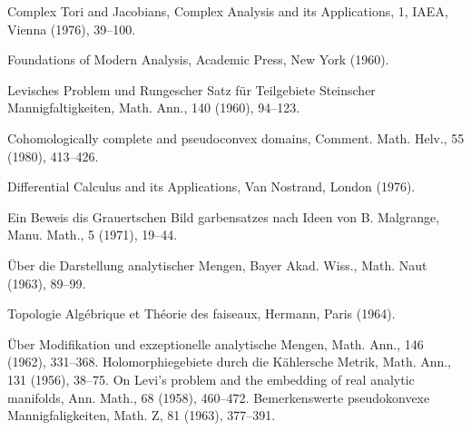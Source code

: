 \begin{sourcebibliography}
 Complex Tori and Jacobians, Complex Analysis and its Applications, 1, IAEA, Vienna (1976), 39--100.
\end{sourcebibliography}
\begin{sourcebibliography}
 Foundations of Modern Analysis, Academic Press, New York (1960).
\end{sourcebibliography}
\begin{sourcebibliography}
 Levisches Problem und Rungescher Satz f\"ur Teilgebiete Steinscher Mannigfaltigkeiten, Math. Ann., 140 (1960), 94--123.
\end{sourcebibliography}
\begin{sourcebibliography}
 Cohomologically complete and pseudoconvex domains, Comment. Math. Helv., 55 (1980), 413--426.
\end{sourcebibliography}
\begin{sourcebibliography}
 Differential Calculus and its Applications, Van Nostrand, London (1976).
\end{sourcebibliography}
\begin{sourcebibliography}
 Ein Beweis dis Grauertschen Bild garbensatzes nach Ideen von B. Malgrange, Manu. Math., 5 (1971), 19--44.
\end{sourcebibliography}
\begin{sourcebibliography}
 \"Uber die Darstellung analytischer Mengen, Bayer Akad. Wiss., Math. Naut (1963), 89--99.
\end{sourcebibliography}
\begin{sourcebibliography}
 Topologie Alg\'ebrique et Th\'eorie des faiseaux, Hermann, Paris (1964).
\end{sourcebibliography}
\begin{sourcebibliography}
 \"Uber Modifikation und exzeptionelle analytische Mengen, Math. Ann., 146 (1962), 331--368.
 Holomorphiegebiete durch die K\"ahlersche Metrik, Math. Ann., 131 (1956), 38--75.
 On Levi's problem and the embedding of real analytic manifolds, Ann. Math., 68 (1958), 460--472.
 Bemerkenswerte pseudokonvexe Mannigfaligkeiten, Math. Z, 81 (1963), 377--391.
\end{sourcebibliography}

